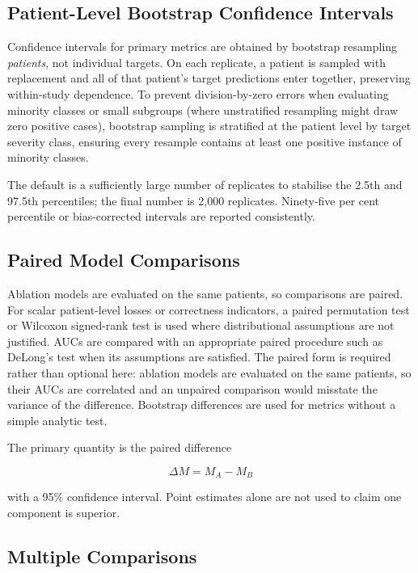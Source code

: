 \subsection{Patient-Level Bootstrap Confidence Intervals}
\label{sec:method-bootstrap}

Confidence intervals for primary metrics are obtained by bootstrap resampling
\emph{patients}, not individual targets. On each replicate, a patient is sampled
with replacement and all of that patient's target predictions enter together,
preserving within-study dependence. To prevent division-by-zero errors when
evaluating minority classes or small subgroups (where unstratified resampling
might draw zero positive cases), bootstrap sampling is stratified at the patient
level by target severity class, ensuring every resample contains at least one
positive instance of minority classes.

The default is a sufficiently large number of replicates to stabilise the
2.5th and 97.5th percentiles; the final number is
2{,}000 replicates. Ninety-five per cent percentile or
bias-corrected intervals are reported consistently.

\subsection{Paired Model Comparisons}
\label{sec:method-paired-tests}

Ablation models are evaluated on the same patients, so comparisons are paired.
For scalar patient-level losses or correctness indicators, a paired permutation
test or Wilcoxon signed-rank test is used where distributional assumptions are
not justified. AUCs are compared with an appropriate paired procedure such as
DeLong's test \cite{delong1988comparing} when its assumptions are satisfied.
The paired form is required rather than optional here: ablation models are
evaluated on the same patients, so their AUCs are correlated and an unpaired
comparison would misstate the variance of the difference. Bootstrap differences
are used for metrics without a simple analytic test.

The primary quantity is the paired difference

\[
\Delta M=M_A-M_B
\]

with a 95\% confidence interval. Point estimates alone are not used to claim
one component is superior.

\subsection{Multiple Comparisons}
\label{sec:method-multiple}

